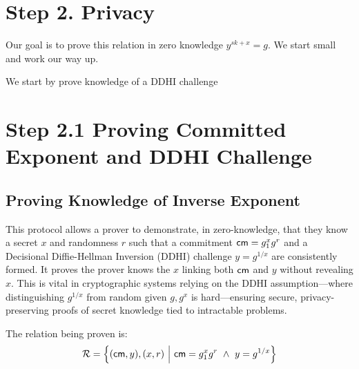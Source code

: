 \newpage
\section{Step 2. Privacy}
Our goal is to prove this relation in zero knowledge $y^{sk+x} = g$. We start small and work our way up. 

We start by prove knowledge of a DDHI challenge


\section{Step 2.1 Proving Committed Exponent and DDHI Challenge}

\subsection*{Proving Knowledge of Inverse Exponent}
This protocol allows a prover to demonstrate, in zero-knowledge, that they know a secret $x$ and randomness $r$ such that a commitment $\mathsf{cm} = g_1^x g^r$ and a Decisional Diffie-Hellman Inversion (DDHI) challenge $y = g^{1/x}$ are consistently formed. It proves the prover knows the $x$ linking both $\mathsf{cm}$ and $y$ without revealing $x$. This is vital in cryptographic systems relying on the DDHI assumption—where distinguishing $g^{1/x}$ from random given $g, g^x$ is hard—ensuring secure, privacy-preserving proofs of secret knowledge tied to intractable problems.

The relation being proven is:
\[
\mathcal{R} = \left\{ (\cm, y), (x, r) \ \middle|\ \cm = g_1^x g^r \ \land\ y = g^{1/x} \right\}
\]



